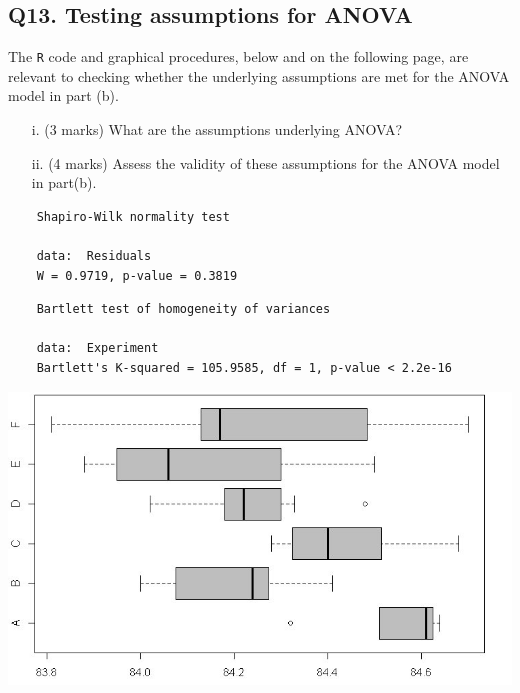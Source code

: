 \documentclass[a4paper,12pt]{article}
\begin{document}
\subsection*{Q13. Testing assumptions for ANOVA } %
The \texttt{R} code and graphical procedures, below and on the following page, are relevant to checking whether the underlying assumptions are met for the ANOVA model in part (b).
\begin{itemize}
	\item[i.] (3 marks) What are the assumptions underlying ANOVA?
	\item[ii.] (4 marks)  Assess the validity of these assumptions for the ANOVA model in part(b).
	
\end{itemize}
\begin{framed}
	\begin{verbatim}
	Shapiro-Wilk normality test
	
	data:  Residuals
	W = 0.9719, p-value = 0.3819
	\end{verbatim}
\end{framed}
\begin{framed}
	\begin{verbatim}
	Bartlett test of homogeneity of variances
	
	data:  Experiment
	Bartlett's K-squared = 105.9585, df = 1, p-value < 2.2e-16
	\end{verbatim}
\end{framed}
\begin{center}
	\includegraphics[scale=0.59]{images/ExamQ5boxplot}
\end{center}
\newpage
\end{document}
